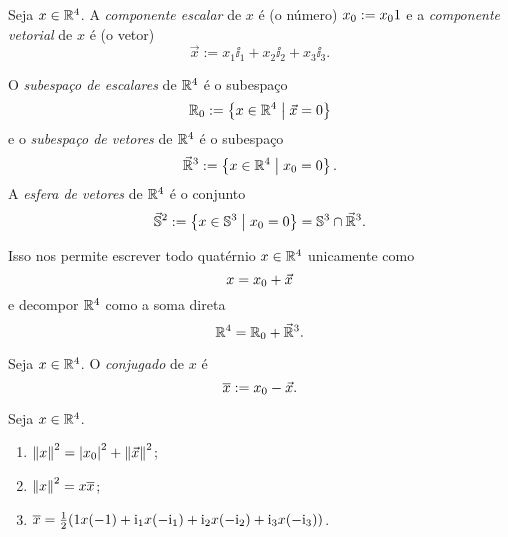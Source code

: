\begin{definition}
Seja $x \in \mathbb{R}^4$. A \emph{componente escalar} de $x$ é (o número) ${x}_0 := x_0 1$ e a \emph{componente vetorial} de $x$ é (o vetor)
	\begin{equation*}
	\vec{x} := x_1 \ii_1 + x_2 \ii_2 + x_3 \ii_3.
	\end{equation*}

O \emph{subespaço de escalares} de $\mathbb{R}^4$ é o subespaço
	\begin{equation*}
	{\mathbb{R}}_0 := \left\{{x \in \mathbb{R}^4}\;\middle\vert\;{\vec{x}=0}\right\}
	\end{equation*}
e o \emph{subespaço de vetores} de $\mathbb{R}^4$ é o subespaço
	\begin{equation*}
	\vec{\mathbb{R}}^3 := \left\{{x \in \mathbb{R}^4}\;\middle\vert\;{{x}_0=0}\right\}.
	\end{equation*}
A \emph{esfera de vetores} de $\mathbb{R}^4$ é o conjunto
	\begin{equation*}
	\vec{\mathbb{S}}^2 := \left\{{x \in \mathbb{S}^3}\;\middle\vert\;{{x}_0=0}\right\} = \mathbb{S}^3 \cap \vec{\mathbb{R}}^3.
	\end{equation*}
\end{definition}

Isso nos permite escrever todo quatérnio $x \in \mathbb{R}^4$ unicamente como
	\begin{equation*}
	x = {x}_0 + \vec{x}
	\end{equation*}
e decompor $\mathbb{R}^4$ como a soma direta
	\begin{equation*}
	\mathbb{R}^4 = {\mathbb{R}}_0 + \vec{\mathbb{R}}^3.
	\end{equation*}

\begin{definition}
Seja $x \in \mathbb{R}^4$. O \emph{conjugado} de $x$ é
	\begin{equation*}
	\overline{x} := {x}_0-\vec{x}.
	\end{equation*}
\end{definition}

\begin{exercise}
Seja $x \in \mathbb{R}^4$.
	\begin{enumerate}
	\item $\left\Vert{x}\right\Vert^2 = \left\vert{{x}_0}\right\vert^2 + \left\Vert{\vec{x}}\right\Vert^2$;
	\item $\left\Vert{x}\right\Vert^2 = x\overline{x}$;
	\item $\overline{x} = \frac{1}{2}(1x(-1) + \mathrm{i}_1 x (-\mathrm{i}_1) + \mathrm{i}_2 x (-\mathrm{i}_2) + \mathrm{i}_3 x (-\mathrm{i}_3))$.
	\end{enumerate}
\end{exercise}

